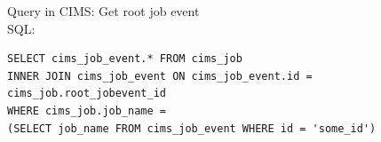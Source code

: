 {%



\label{q:getrootts}
Query in CIMS: Get root job event \\
SQL:
\begin{verbatim}
SELECT cims_job_event.* FROM cims_job
INNER JOIN cims_job_event ON cims_job_event.id = cims_job.root_jobevent_id
WHERE cims_job.job_name =
(SELECT job_name FROM cims_job_event WHERE id = 'some_id')


\end{verbatim}}
